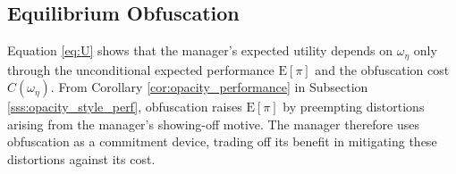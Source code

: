 
\subsection{Equilibrium Obfuscation}
Equation \eqref{eq:U} shows that the manager's expected utility depends on $\omega_{\eta}$ only through the unconditional expected performance $\mathrm{E}[\pi]$ and the obfuscation cost $C(\omega_{\eta})$. From Corollary \ref{cor:opacity_performance} in Subsection \ref{sss:opacity_style_perf}, obfuscation raises $\mathrm{E}[\pi]$ by preempting distortions arising from the manager's showing-off motive. The manager therefore uses obfuscation as a commitment device, trading off its benefit in mitigating these distortions against its cost.

